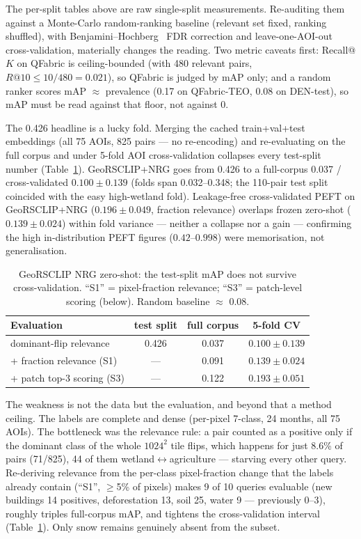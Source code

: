 \documentclass{article}
\begin{document}
The per-split tables above are raw single-split measurements. Re-auditing them
against a Monte-Carlo random-ranking baseline (relevant set fixed, ranking
shuffled), with Benjamini--Hochberg~\cite{benjaminihochberg} FDR correction and leave-one-AOI-out
cross-validation, materially changes the reading. Two metric caveats first:
Recall@$K$ on QFabric is ceiling-bounded (with 480 relevant pairs, $R@10 \le
10/480 = 0.021$), so QFabric is judged by mAP only; and a random ranker scores
mAP $\approx$ prevalence (0.17 on QFabric-TEO, 0.08 on DEN-test), so mAP must be
read against that floor, not against 0.

\medskip\noindent The 0.426 headline is a lucky fold. Merging the cached
train+val+test embeddings (all 75 AOIs, 825 pairs --- no re-encoding) and
re-evaluating on the full corpus and under 5-fold AOI cross-validation collapses
every test-split number (Table~\ref{tab:cv}). GeoRSCLIP+NRG goes from 0.426 to a
full-corpus 0.037 / cross-validated $0.100 \pm 0.139$ (folds span 0.032--0.348;
the 110-pair test split coincided with the easy high-wetland fold). Leakage-free
cross-validated PEFT on GeoRSCLIP+NRG ($0.196 \pm 0.049$, fraction relevance)
overlaps frozen zero-shot ($0.139 \pm 0.024$) within fold variance --- neither a
collapse nor a gain --- confirming the high in-distribution PEFT figures
($0.42$--$0.998$) were memorisation, not generalisation.

\begin{table}[H]
    \centering
    \caption{GeoRSCLIP NRG zero-shot: the test-split mAP does not survive
    cross-validation. ``S1'' = pixel-fraction relevance; ``S3'' = patch-level
    scoring (below). Random baseline $\approx$ 0.08.}
    \label{tab:cv}
    \begin{tabular}{lccc}
        \toprule
        \textbf{Evaluation} & \textbf{test split} & \textbf{full corpus} & \textbf{5-fold CV} \\
        \midrule
        dominant-flip relevance      & 0.426 & 0.037 & $0.100 \pm 0.139$ \\
        + fraction relevance (S1)    & ---   & 0.091 & $0.139 \pm 0.024$ \\
        + patch top-3 scoring (S3)   & ---   & 0.122 & $\mathbf{0.193 \pm 0.051}$ \\
        \bottomrule
    \end{tabular}
\end{table}

\noindent The weakness is not the data but the evaluation, and beyond that a method
ceiling. The labels are complete and dense (per-pixel 7-class, 24 months, all
75 AOIs). The bottleneck was the relevance rule: a pair counted as a positive
only if the dominant class of the whole $1024^2$ tile flips, which happens
for just 8.6\% of pairs (71/825), 44 of them wetland$\leftrightarrow$agriculture
--- starving every other query. Re-deriving relevance from the per-class
pixel-fraction change that the labels already contain (``S1'', $\geq$5\% of
pixels) makes 9 of 10 queries evaluable (new buildings 14 positives,
deforestation 13, soil 25, water 9 --- previously 0--3), roughly triples
full-corpus mAP, and tightens the cross-validation interval (Table~\ref{tab:cv}).
Only snow remains genuinely absent from the subset.
\end{document}
